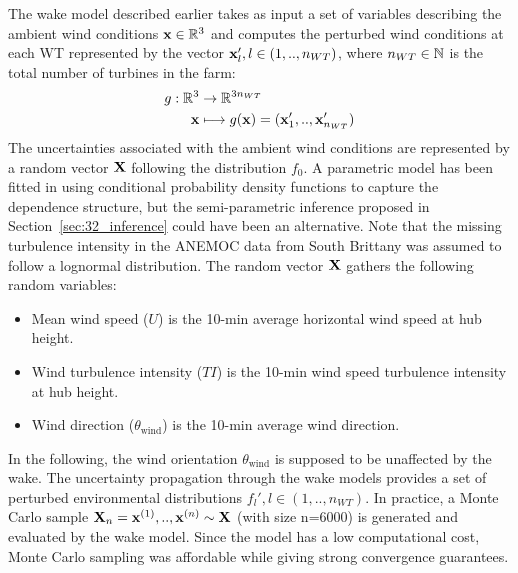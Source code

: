 The wake model described earlier takes as input a set of variables describing the ambient wind conditions ${\bf x} \in \mathbb{R}^3$ and computes the perturbed wind conditions at each WT represented by the vector ${\bf x} _l', l \in (1,..,n_{WT})$, where $n_{WT} \in \mathbb{N}$ is the total number of turbines in the farm:
\begin{align}
    g:\mathbb{R}^3 &\rightarrow \mathbb{R}^{3 n_{WT}} \\
    {\bf x} &\longmapsto g({\bf x}) = ({\bf x}_1',..,{\bf x}_{n_{WT}}')
\end{align}
The uncertainties associated with the ambient wind conditions are represented by a random vector ${\bf X}$ following the distribution $f_0$. 
A parametric model has been fitted in \cite{vanem_fekhari_2023} using conditional probability density functions to capture the dependence structure, 
but the semi-parametric inference proposed in Section~\ref{sec:32_inference} could have been an alternative. 
Note that the missing turbulence intensity in the ANEMOC data from South Brittany was assumed to follow a lognormal distribution.   
The random vector ${\bf X}$ gathers the following random variables:
\begin{itemize}
    \item Mean wind speed ($U$) is the 10-min average horizontal wind speed at hub height.
    \item Wind turbulence intensity ($TI$) is the 10-min wind speed turbulence intensity at hub height.
    \item Wind direction ($\theta_{\mathrm{wind}}$) is the 10-min average wind direction.
\end{itemize}

In the following, the wind orientation $\theta_{\mathrm{wind}}$ is supposed to be unaffected by the wake. 
The uncertainty propagation through the wake models provides a set of perturbed environmental distributions $f_l', l \in (1,..,n_{WT})$. 
In practice, a Monte Carlo sample ${\bf X}_n={{\bf x}^{(1)},..,{\bf x}^{(n)}} \sim {\bf X}$ (with size n=6000) is generated and evaluated by the wake model. 
Since the model has a low computational cost, Monte Carlo sampling was affordable while giving strong convergence guarantees. 

